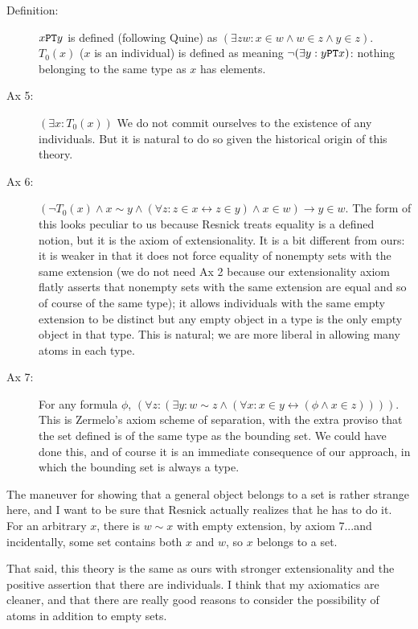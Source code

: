 \documentclass[12pt]{article}
\begin{document}
\begin{description}
\item[Definition:]  $x {\tt PT} y$ is defined (following Quine) as $(\exists zw:x \in w \wedge w \in z \wedge y \in z)$.  $T_0(x)$ ($x$ is an individual)
is defined as meaning $\neg(\exists y:y {\tt PT} x)$:  nothing belonging to the same type as $x$ has elements.

\item[Ax 5:]  $(\exists x:T_0(x))$  We do not commit ourselves to the existence of any individuals.  But it is natural to do so given the historical origin of this theory.

\item[Ax 6:]  $(\neg T_0(x) \wedge x \sim y \wedge (\forall z:z \in x \leftrightarrow z \in y) \wedge x \in w) \rightarrow y \in w$.  The form of this looks peculiar to us because Resnick treats equality is a defined notion, but it is the axiom of extensionality.  It is a bit different from ours:  it is weaker in that it does not force equality of nonempty sets with the same extension (we do not need Ax 2 because our extensionality axiom flatly asserts that nonempty sets with the same extension are equal and so of course of the same type);  it allows individuals with the same empty extension to be distinct but any empty object in a type is the only empty object in that type.  This is natural;  we are more liberal in allowing many atoms in each type.

\item[Ax 7:] For any formula $\phi$, $(\forall z:(\exists y:w \sim z \wedge (\forall x:x \in y \leftrightarrow (\phi \wedge x \in z))))$.  This is Zermelo's axiom scheme of separation, with the extra proviso that the set defined is of the same type as the bounding set.  We could have done this, and of course it is an immediate consequence of our approach, in which the bounding set is always a type.

\end{description}

The maneuver for showing that a general object belongs to a set is rather strange here, and I want to be sure that Resnick actually realizes that he has to do it.
For an arbitrary $x$, there is $w \sim x$ with empty extension, by axiom 7...and incidentally, some set contains both $x$ and $w$, so $x$ belongs to a set.

That said, this theory is the same as ours with stronger extensionality and the positive assertion that there are individuals.  I think that my axiomatics are cleaner, and that there are really good reasons to consider the possibility of atoms in addition to empty sets.
\end{document}
